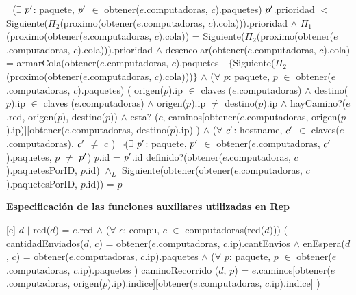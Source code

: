 \begin{Representacion}
{	$\neg$($\exists$ $p\sp{\prime}$: paquete, $p\sp{\prime}$ $\in$ obtener($e$.computadoras, $c$).paquetes) $p\sp{\prime}$.prioridad $<$ Siguiente($\Pi_2$(proximo(obtener($e$.computadoras, $c$).cola))).prioridad $\wedge$ \newline
	$\Pi_1$(proximo(obtener($e$.computadoras, $c$).cola)) = Siguiente($\Pi_2$(proximo(obtener($e$.computadoras, $c$).cola))).prioridad $\wedge$ \newline
	desencolar(obtener($e$.computadoras, $c$).cola) = armarCola(obtener($e$.computadoras, $c$).paquetes - $\{$Siguiente($\Pi_2$(proximo(obtener($e$.computadoras, $c$).cola)))$\}$ $\wedge$
	\newline
	($\forall$ $p$: paquete, $p$ $\in$ obtener($e$.computadoras, $c$).paquetes) (
	 origen($p$).ip $\in$ claves ($e$.computadoras) $\wedge$ 
destino($p$).ip $\in$ claves ($e$.computadoras) $\wedge$ 
	 origen($p$).ip $\neq$ destino($p$).ip $\wedge$ 
	 hayCamino?($e$.red, origen($p$), destino($p$)) $\wedge$ 
	 esta? ($c$, caminos[obtener($e$.computadoras, origen($p$).ip)][obtener($e$.computadoras, destino($p$).ip) ) $\wedge$
	 ($\forall$ $c\sp{\prime}$: hostname, $c\sp{\prime}$ $\in$ claves($e$.computadoras), $c\sp{\prime}$ $\neq$ $c$ )  $\neg$($\exists$ $p\sp{\prime}$: paquete, $p\sp{\prime}$ $\in$ obtener($e$.computadoras, $c\sp{\prime}$).paquetes, $p$ $\neq$ $p\sp{\prime}$) $p$.id = $p\sp{\prime}$.id 
	definido?(obtener($e$.computadoras, $c$).paquetesPorID, $p$.id) $\wedge_L$ \newline
	Siguiente(obtener(obtener($e$.computadoras, $c$).paquetesPorID,  $p$.id)) = $p$
}
\newpage


\textbf{Especificaci\'on de las funciones auxiliares utilizadas en Rep}





\textbf{}

[e]{ $d$ $|$ 
red($d$) = $e$.red $\wedge$ \newline
($\forall$ $c$: compu, $c$ $\in$ computadoras(red($d$))) ( \newline
cantidadEnviados($d$, $c$) = obtener($e$.computadoras, $c$.ip).cantEnvios $\wedge$ \newline
enEspera($d$, $c$) = obtener($e$.computadoras, $c$.ip).paquetes $\wedge$ \newline
($\forall$ $p$: paquete, $p$ $\in$  obtener($e$.computadoras, $c$.ip).paquetes ) 
caminoRecorrido ($d$, $p$) = $e$.caminos[obtener($e$.computadoras, origen($p$).ip).indice][obtener($e$.computadoras, $c$.ip).indice] ) 
}

\end{Representacion}


